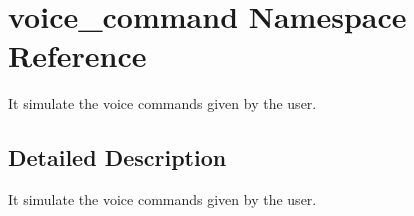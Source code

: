 \hypertarget{namespacevoice__command}{}\section{voice\+\_\+command Namespace Reference}
\label{namespacevoice__command}


It simulate the voice commands given by the user.  




\subsection{Detailed Description}
It simulate the voice commands given by the user. 